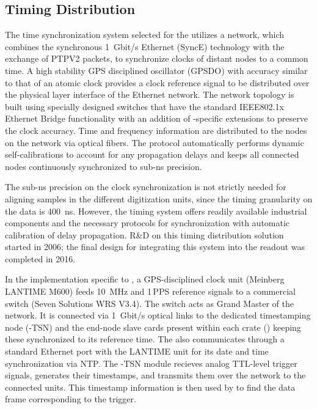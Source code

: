\subsection{Timing Distribution}
\label{sec:fddp-tpc-elec-wr}
The time synchronization system selected for the  utilizes a  network, which combines the synchronous \SI{1}{Gbit/s} Ethernet (SyncE) technology with the exchange of PTPV2 packets, to synchronize clocks of distant nodes to a common time. A high stability GPS disciplined oscillator (GPSDO) with  accuracy similar to that of an atomic clock provides a clock reference signal to be distributed over the physical layer interface of the  Ethernet network. The network topology is built using specially designed switches that have the standard IEEE802.1x Ethernet Bridge functionality with an addition of -specific extensions to preserve the clock accuracy. Time and frequency information are distributed to the nodes on the  network via optical fibers. The  protocol automatically performs dynamic self-calibrations to account for any propagation delays and keeps all connected nodes continuously synchronized to sub-ns precision. 

The sub-ns %
precision on the clock synchronization is not strictly needed for aligning samples in the different  digitization units, since the %
timing granularity on the data is \SI{400}{ns}. However, the  timing system offers readily available industrial components and the necessary protocols %
for synchronization with automatic calibration of delay propagation. %
R\&D on this timing distribution solution started in 2006; the final design for integrating this system into the   readout was completed in 2016.  

In the implementation specific to , a GPS-disciplined  clock unit (Meinberg LANTIME M600) feeds \SI{10}{MHz} and \num{1}\,PPS reference signals to a commercial  switch (Seven Solutions WRS V3.4). The switch acts as Grand Master of the  network. It is connected via \SI{1}{Gbit/s} optical links to the dedicated  timestamping node (-TSN) and the  end-node slave cards present within each  crate () keeping these synchronized to its reference time. The  also communicates through a standard Ethernet port with the LANTIME unit for its date and time synchronization via NTP. The -TSN module recieves analog TTL-level trigger signals, generates their timestamps, and transmits them over the  network to the connected  units. This timestamp information is then used by  to find the data frame corresponding to the trigger. 


